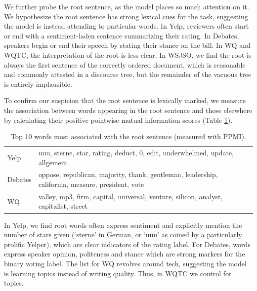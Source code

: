 We further probe the root sentence, as the model places so much attention on it. We hypothesize the root sentence has strong lexical cues for the task, suggesting the model is instead attending to particular words. In Yelp, reviewers often start or end with a sentiment-laden sentence summarizing their rating. In Debates, speakers begin or end their speech by stating their stance on the bill. In WQ and WQTC, the interpretation of the root is less clear. In WSJSO, we find the root is always the first sentence of the correctly ordered document, which is reasonable and commonly attested in a discourse tree, but the remainder of the vacuous tree is entirely implausible.

To confirm our suspicion that the root sentence is lexically marked, we measure the association between words appearing in the root sentence and those elsewhere by calculating their positive pointwise mutual information scores (Table \ref{tab:latent_ppmi}). 

\begin{table}[t!]
\small
     \begin{center}
     \begin{tabular}{lp{5.5cm}}
\toprule
Yelp                & uuu, sterne, star, rating, deduct, 0, edit, underwhelmed, update, allgemein \\ 
Debates & oppose, republican, majority, thank, gentleman, leadership, california, measure, president, vote    \\ 
WQ     & valley, mp3, firm, capital, universal, venture, silicon, analyst, capitalist, street        \\ \bottomrule
\end{tabular}
\vspace{-0.7em}
\caption{Top 10 words most associated with the root sentence (measured with PPMI).}
      \label{tab:latent_ppmi}
      \end{center}
      \end{table}
      
In Yelp, we find root words often express sentiment and explicitly mention the number of stars given (`sterne' in German, or `uuu' as coined by a particularly prolific Yelper), which are clear indicators of the rating label. For Debates, words express speaker opinion, politeness and stance which are strong markers for the binary voting label. The list for WQ revolves around tech, suggesting the model is learning topics instead of writing quality. Thus, in WQTC we control for topics.



